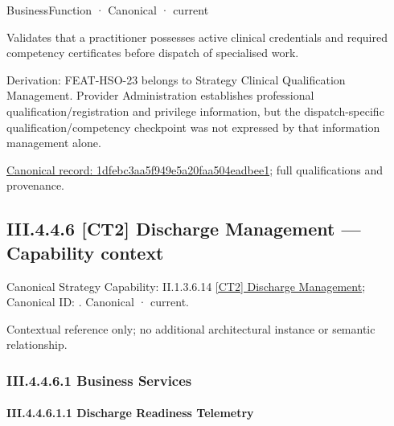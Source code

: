\label{element:1dfebc3aa5f949e5a20faa504eadbee1}
{\small BusinessFunction · Canonical · current}\par

Validates that a practitioner possesses active clinical credentials and required competency certificates before dispatch of specialised work.



Derivation: FEAT-HSO-23 belongs to Strategy Clinical Qualification Management. Provider Administration establishes professional qualification/registration and privilege information, but the dispatch-specific qualification/competency checkpoint was not expressed by that information management alone.


{\footnotesize \href{../../../../continuum/business/business-function/1dfebc3aa5f949e5a20faa504eadbee1.md}{Canonical record: 1dfebc3aa5f949e5a20faa504eadbee1}; full qualifications and provenance.}\par
\subsection*{III.4.4.6 [CT2] Discharge Management — Capability context}
\label{navigation:III.4.4.6}

{\small Canonical Strategy Capability: II.1.3.6.14 \hyperref[element:ec5e8d6732764aa489c2dd7630fc8fef]{[CT2] Discharge Management}; Canonical ID: \texttt{}. Canonical · current.}\par
Contextual reference only; no additional architectural instance or semantic relationship.\par
\subsubsection*{III.4.4.6.1 Business Services}
\label{navigation:III.4.4.6.1}

\paragraph*{III.4.4.6.1.1 Discharge Readiness Telemetry}
\label{navigation:III.4.4.6.1.1}


